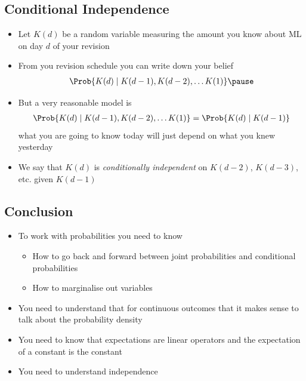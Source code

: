 
\begin{slide}
\section[-2]{Conditional Independence}

\begin{PauseHighLight}
  \begin{itemize}
  \item Let $K(d)$ be a random variable measuring the amount you know
    about ML on day $d$ of your revision\pause
  \item From you revision schedule you can write down your belief
    \begin{align*}
      \Prob{K(d) \mid K(d-1), K(d-2), \ldots K(1)}\pause
    \end{align*}
  \item But a very reasonable model is
    \begin{align*}
      \Prob{K(d) \mid K(d-1), K(d-2), \ldots K(1)} = \Prob{K(d)\mid K(d-1)}
    \end{align*}
    what you are going to know today will just depend on what you knew
    yesterday\pause
  \item We say that $K(d)$ is \emph{conditionally independent }on $K(d-2)$,
    $K(d-3)$, etc.{} given $K(d-1)$\pause
  \end{itemize}
\end{PauseHighLight}

\end{slide}



\begin{slide}
\section{Conclusion}
  
\begin{PauseHighLight}
  \begin{itemize}
  \item To work with probabilities you need to know
    \begin{itemize}
    \item How to go back and forward between joint
      probabilities and conditional probabilities
    \item How to marginalise out variables\pause
    \end{itemize}
  \item You need to understand that for continuous outcomes that it
    makes sense to talk about the probability density\pause
  \item You need to know that expectations are linear operators and
    the expectation of a constant is the constant\pause
  \item You need to understand independence\pause
  \end{itemize}
\end{PauseHighLight}

\end{slide}


